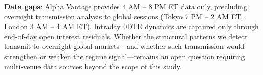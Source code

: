 \textbf{Data gaps}: Alpha Vantage provides 4 AM -- 8 PM ET data only, precluding overnight transmission analysis to global sessions (Tokyo 7 PM -- 2 AM ET, London 3 AM -- 4 AM ET). Intraday 0DTE dynamics are captured only through end-of-day open interest residuals. Whether the structural patterns we detect transmit to overnight global markets---and whether such transmission would strengthen or weaken the regime signal---remains an open question requiring multi-venue data sources beyond the scope of this study.
